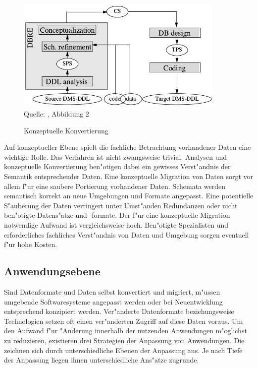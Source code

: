 \begin{figure}[h!]
	\centering
	\caption{Konzeptuelle Konvertierung}
	\label{pic:conversion_conceptual}
	\includegraphics[width=0.9\textwidth]{../images/strategies_fig_02b.png} \\
	\tiny Quelle: \citep{henrard-2002}, Abbildung 2
\end{figure}

Auf konzeptueller Ebene spielt die fachliche Betrachtung vorhandener Daten eine wichtige Rolle. Das Verfahren ist nicht zwangsweise trivial. Analysen und konzeptuelle Konvertierung ben"otigen dabei ein gewisses Verst"andnis der Semantik entsprechender Daten.
\lb
Eine konzeptuelle Migration von Daten sorgt vor allem f"ur eine saubere Portierung vorhandener Daten. Schemata werden semantisch korrekt an neue Umgebungen und Formate angepasst. Eine potentielle S"auberung der Daten verringert unter Umst"anden Redundanzen oder nicht ben"otigte Datens"atze und -formate.
\newpage
Der f"ur eine konzeptuelle Migration notwendige Aufwand ist vergleichsweise hoch. Ben"otigte Spezialisten und erforderliches fachliches Verst"andnis von Daten und Umgebung sorgen eventuell f"ur hohe Kosten.

\subsection{Anwendungsebene}

Sind Datenformate und Daten selbst konvertiert und migriert, m"ussen umgebende Softwaresysteme angepasst werden oder bei Neuentwicklung entsprechend konzipiert werden. Ver"anderte Datenformate beziehungsweise Technologien setzen oft einen ver"anderten Zugriff auf diese Daten voraus. Um den Aufwand f"ur "Anderung innerhalb der nutzenden Anwendungen m"oglichst zu reduzieren, existieren drei Strategien der Anpassung von Anwendungen. Die zeichnen sich durch unterschiedliche Ebenen der Anpassung aus. Je nach Tiefe der Anpassung liegen ihnen unterschiedliche Ans"atze zugrunde. 

